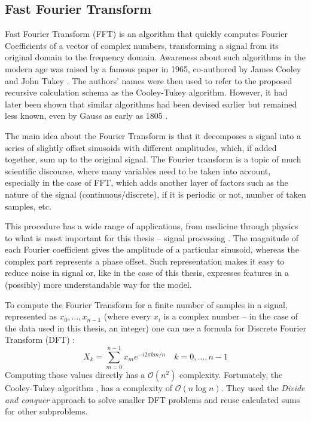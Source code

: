\documentclass[../main.tex]{subfiles}
\begin{document}
\subsection{Fast Fourier Transform}
\label{sec:dataset_fft}

Fast Fourier Transform (FFT) is an algorithm that quickly computes Fourier Coefficients of a vector of complex numbers, transforming a signal from its original domain to the frequency domain. Awareness about such algorithms in the modern age was raised by a famous paper in 1965, co-authored by James Cooley and John Tukey \cite{fft_1965_algorithm}. The authors' names were then used to refer to the proposed recursive calculation schema as the Cooley-Tukey algorithm. However, it had later been shown that similar algorithms had been devised earlier but remained less known, even by Gauss as early as 1805 \cite{fft_gauss}. 

The main idea about the Fourier Transform is that it decomposes a signal into a series of slightly offset sinusoids with different amplitudes, which, if added together, sum up to the original signal. The Fourier transform is a topic of much scientific discourse, where many variables need to be taken into account, especially in the case of FFT, which adds another layer of factors such as the nature of the signal (continuous/discrete), if it is periodic or not, number of taken samples, etc. 

This procedure has a wide range of applications, from medicine \cite{fft_examples_medical} through physics to what is most important for this thesis -- signal processing \cite{fft_examples_signal}. The magnitude of each Fourier coefficient gives the amplitude of a particular sinusoid, whereas the complex part represents a phase offset. Such representation makes it easy to reduce noise in signal or, like in the case of this thesis, expresses features in a (possibly) more understandable way for the model.


To compute the Fourier Transform for a finite number of samples in a signal, represented as $x_0, \dots, x_{n-1}$ (where every $x_i$ is a complex number -- in the case of the data used in this thesis, an integer) one can use a formula for Discrete Fourier Transform (DFT) \cite{fft_source_math}:
{\large
\[
    X_k = \sum_{m=0}^{n-1}x_{m}e^{-i2\pi km/n} \quad k = 0, \dots, n-1
\]
}
Computing those values directly has a $\mathcal{O}(n^2)$ complexity. Fortunately, the Cooley-Tukey algorithm \cite{fft_1965_algorithm}, has a complexity of $\mathcal{O}( n\log{n})$. They used the \textit{Divide and conquer} approach to solve smaller DFT problems and reuse calculated sums for other subproblems.
\end{document}
